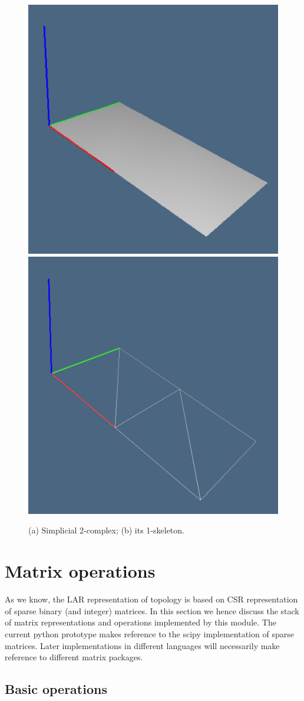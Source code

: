\documentclass[11pt,oneside]{article}	%
\begin{document}
\begin{figure}[htbp] %
   \centering
   \includegraphics[height=0.25\linewidth,width=0.25\linewidth]{images/larcc1a} 
   \includegraphics[height=0.25\linewidth,width=0.25\linewidth]{images/larcc1b} 
   \caption{(a) Simplicial 2-complex; (b) its 1-skeleton.}
   \label{fig:2D-non-manifold}
\end{figure}

\section{Matrix operations}

As we know, the LAR representation of topology is based on CSR representation of sparse binary (and integer) matrices. In this section we hence discuss the stack of matrix representations and operations implemented by this module.  The current python prototype makes reference to the scipy implementation of sparse matrices. Later implementations in different languages will necessarily make reference to different matrix packages.


\subsection{Basic operations}
\end{document}
